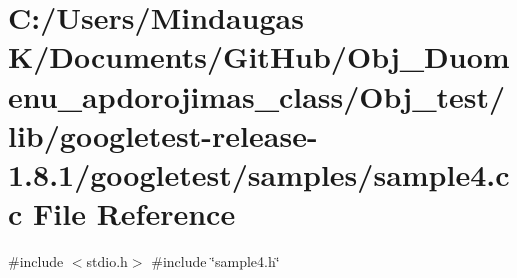 \hypertarget{_obj__test_2lib_2googletest-release-1_88_81_2googletest_2samples_2sample4_8cc}{}\section{C\+:/\+Users/\+Mindaugas K/\+Documents/\+Git\+Hub/\+Obj\+\_\+\+Duomenu\+\_\+apdorojimas\+\_\+class/\+Obj\+\_\+test/lib/googletest-\/release-\/1.8.1/googletest/samples/sample4.cc File Reference}
\label{_obj__test_2lib_2googletest-release-1_88_81_2googletest_2samples_2sample4_8cc}
{\ttfamily \#include $<$stdio.\+h$>$}\newline
{\ttfamily \#include \char`\"{}sample4.\+h\char`\"{}}\newline

